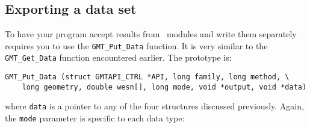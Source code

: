 \documentclass{report}
\begin{document}
\subsection{Exporting a data set}

To have your program accept results from \GMT\ modules and write them
separately requires you to use the \texttt{GMT\_Put\_Data} function.  It is
very similar to the \texttt{GMT\_Get\_Data} function encountered earlier.
The prototype is:

\begin{verbatim}
GMT_Put_Data (struct GMTAPI_CTRL *API, long family, long method, \
    long geometry, double wesn[], long mode, void *output, void *data)
\end{verbatim}
where \texttt{data} is a pointer to any of the four structures
discussed previously.  Again, the \texttt{mode} parameter is specific to
each data type:
\end{document}
